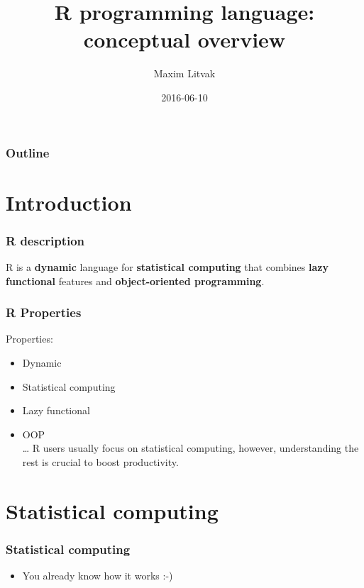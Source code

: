 \documentclass[bigger]{beamer}
\title{R programming language: conceptual overview}
\author{Maxim Litvak}
\date{2016-06-10}
\begin{document}
\maketitle

\begin{frame}
\frametitle{Outline}
\setcounter{tocdepth}{3}
\tableofcontents
\end{frame}
\section{Introduction}
\label{sec-1}
\begin{frame}
\frametitle{R description}
\label{sec-1-1}

R is a \textbf{dynamic} language for \textbf{statistical computing} that combines \textbf{lazy functional} features and \textbf{object-oriented programming}.
\end{frame}
\begin{frame}
\frametitle{R Properties}
\label{sec-1-2}

Properties:
\begin{itemize}

\item Dynamic
\label{sec-1-2-1}%

\item Statistical computing
\label{sec-1-2-2}%

\item Lazy functional
\label{sec-1-2-3}%

\item OOP\\
\label{sec-1-2-4}%
\ldots{} R users usually focus on statistical computing, however, understanding the rest is crucial to boost productivity.
\end{itemize} %
\end{frame}
\section{Statistical computing}
\label{sec-2}
\begin{frame}
\frametitle{Statistical computing}
\label{sec-2-1}
\begin{itemize}

\item You already know how it works :-)
\label{sec-2-1-1}%
\end{itemize} %
\end{frame}
\end{document}
